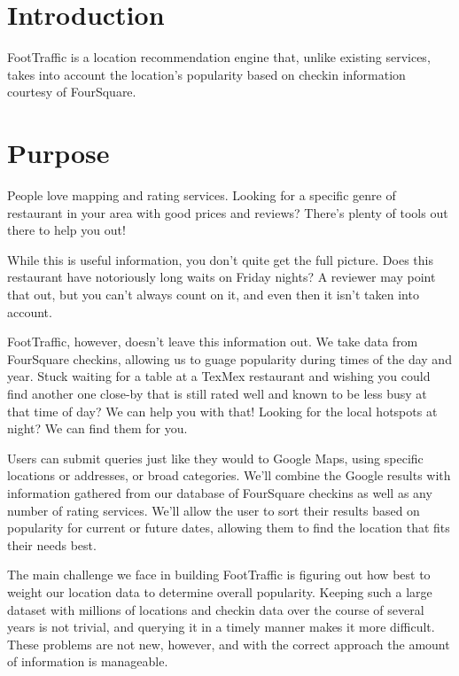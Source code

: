 \documentclass{article}
\begin{document}
%


%

%
\section{Introduction}
FootTraffic is a location recommendation engine that, unlike existing services, takes into account the location's popularity based on checkin information courtesy of FourSquare.

\section{Purpose}
People love mapping and rating services. Looking for a specific genre of restaurant in your area with good prices and reviews? There's plenty of tools out there to help you out!

While this is useful information, you don't quite get the full picture. Does this restaurant have notoriously long waits on Friday nights? A reviewer may point that out, but you can't always count on it, and even then it isn't taken into account.

FootTraffic, however, doesn't leave this information out. We take data from FourSquare checkins, allowing us to guage popularity during times of the day and year. Stuck waiting for a table at a TexMex restaurant and wishing you could find another one close-by that is still rated well and known to be less busy at that time of day? We can help you with that! Looking for the local hotspots at night? We can find them for you.  

Users can submit queries just like they would to Google Maps, using specific locations or addresses, or broad categories. We'll combine the Google results with information gathered from our database of FourSquare checkins as well as any number of rating services. We'll allow the user to sort their results based on popularity for current or future dates, allowing them to find the location that fits their needs best.

The main challenge we face in building FootTraffic is figuring out how best to weight our location data to determine overall popularity. Keeping such a large dataset with millions of locations and checkin data over the course of several years is not trivial, and querying it in a timely manner makes it more difficult. These problems are not new, however, and with the correct approach the amount of information is manageable.
\end{document}
